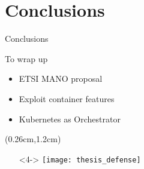 \section{Conclusions}
\begin{frame}{Conclusions}

  To wrap up
  \begin{itemize}
  \item<1-> ETSI MANO proposal
  \item<2-> Exploit container features
  \item<3-> Kubernetes as Orchestrator
  \end{itemize}

  \begin{textblock*}{5cm}(0.26cm,1.2cm)
    \begin{itemize}
      \item[]<4-> \centering \texttt{[image: thesis\_defense]}
    \end{itemize}
  \end{textblock*}
\end{frame}
